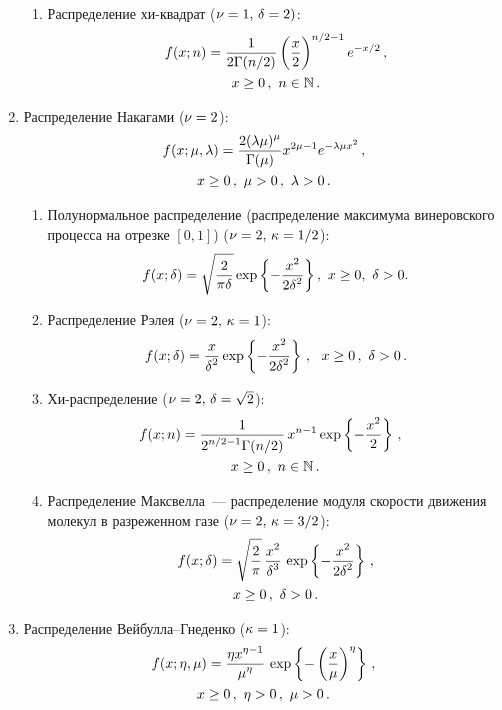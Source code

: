 \begin{multicols}{2}
\begin{enumerate}[1.]
\begin{enumerate}[{1}.1]
\item Распределение хи-квад\-рат ($\nu\hm=1,\, \delta\hm=2)$:
\begin{multline*}
f(x;n)=\displaystyle\frac{\displaystyle 1\mathstrut}{\displaystyle 2\Gamma({n}/2)\mathstrut}\left(\displaystyle\frac{\displaystyle x\mathstrut}{\displaystyle 2\mathstrut}\right)^{n/2-1}e^{-x/2}\,,\\
x\ge0\,,\ n\in\mathbb{N}\,.
\end{multline*}
\end{enumerate}
\item Распределение Накагами ($\nu\hm=2$):
\begin{multline*}
f(x;\mu,\lambda)=\displaystyle\frac{\displaystyle 2(\lambda\mu)^{\mu}\mathstrut}{\displaystyle \Gamma(\mu)\mathstrut}x^{2\mu-1}e^{-\lambda\mu
x^2}\,,\\
 x\ge0\,, \ \mu>0\,,\ \lambda>0\,.
\end{multline*}
\begin{enumerate}[{2.}1]
\item Полунормальное распределение (распределение максимума
винеровского процесса на отрезке $[0,1]$)
($\nu\hm=2,\,\kappa\hm=1/2$):
\begin{equation*}
f(x;\delta)=\sqrt{\displaystyle\frac{\displaystyle 2\mathstrut}{\displaystyle \pi\delta\mathstrut}}\exp\left\{-\displaystyle\frac{\displaystyle x^2\mathstrut}{\displaystyle 2\delta^2\mathstrut}\right\},\
x\ge0, \ \delta>0.
\end{equation*}
\item Распределение Рэлея ($\nu\hm=2,\,\kappa\hm=1$):
\begin{equation*}
f(x;\delta)=\fr{x}{\delta^2}\exp\left\{-\fr{x^2}{2\delta^2}\right\}\,,\ \ 
x\ge0\,, \ \delta>0\,.
\end{equation*}

\item Хи-распределение ($\nu\hm=2,\,\delta\hm=\sqrt{2}$):
\begin{multline*}
\hspace*{-7pt}f(x;n)=\displaystyle\frac{\displaystyle 1\mathstrut}{\displaystyle 2^{n/2-1}\Gamma({n}/{2})\mathstrut}\,x^{n-1}\exp\left\{-\displaystyle\frac{\displaystyle x^2\mathstrut}{\displaystyle 2\mathstrut}\right\}\,,\\
x\ge0\,, \ n\in\mathbb{N}\,.
\end{multline*}
\item Распределение Максвелла~--- распределение модуля скорости движения
молекул в разреженном газе ($\nu=\hm2,\,\kappa\hm=3/2$):
\begin{multline*}
f(x;\delta)=\sqrt{\displaystyle\frac{\displaystyle 2\mathstrut}{\displaystyle \pi\mathstrut}}\,\displaystyle\frac{\displaystyle x^2\mathstrut}{\displaystyle \delta^3\mathstrut}\,\exp\left\{-\displaystyle\frac{\displaystyle x^2\mathstrut}{\displaystyle 2\delta^2\mathstrut}\right\}\,,\\
x\ge0\,, \ \delta>0\,.
\end{multline*}
\end{enumerate}
\item Распределение Вей\-бул\-ла--Гне\-ден\-ко ($\kappa\hm=1$):
\begin{multline*}
f(x;\eta,\mu)=\displaystyle\frac{\displaystyle \eta x^{\eta-1}\mathstrut}{\displaystyle \mu^{\eta}\mathstrut}\,
\exp\left\{-\left(\displaystyle\frac{\displaystyle x\mathstrut}{\displaystyle \mu\mathstrut}\right)^{\eta}\right\}\,,\\
x\ge0\,, \ \eta>0\,,\ \mu>0\,.
\end{multline*}


\end{enumerate}
\end{multicols}
